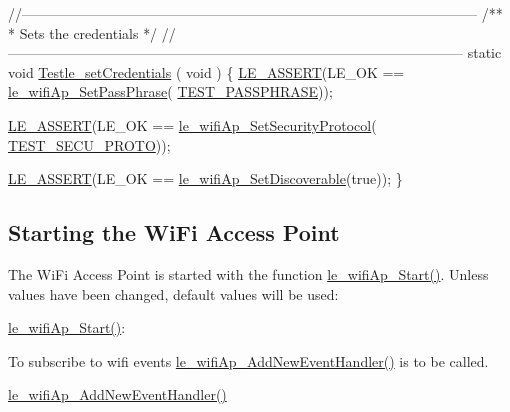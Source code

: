 \begin{DoxyCodeInclude}
\textcolor{comment}{//--------------------------------------------------------------------------------------------------}\textcolor{comment}{}
\textcolor{comment}{/**}
\textcolor{comment}{ * Sets the credentials}
\textcolor{comment}{ */}
\textcolor{comment}{//--------------------------------------------------------------------------------------------------}
\textcolor{keyword}{static} \textcolor{keywordtype}{void} \hyperlink{wifi_ap_test_8c_a9931b1b22f7842b4e5e857c037d3b80a}{Testle\_setCredentials}
(
    \textcolor{keywordtype}{void}
)
\{
    \hyperlink{le__log_8h_ac0dbbef91dc0fed449d0092ff0557b39}{LE\_ASSERT}(LE\_OK == \hyperlink{le__wifi_ap__interface_8h_a8be6c0c7aad3e14f492898df6f131c5b}{le\_wifiAp\_SetPassPhrase}(
      \hyperlink{wifi_ap_test_8c_a6dae61215af0bc9a5f4507b389439073}{TEST\_PASSPHRASE}));

    \hyperlink{le__log_8h_ac0dbbef91dc0fed449d0092ff0557b39}{LE\_ASSERT}(LE\_OK == \hyperlink{le__wifi_ap__interface_8h_a0985bb7661b81c6882a170855c7c8298}{le\_wifiAp\_SetSecurityProtocol}(
      \hyperlink{wifi_ap_test_8c_a807da4648e89f5ecce53c1700120b7b3}{TEST\_SECU\_PROTO}));

    \hyperlink{le__log_8h_ac0dbbef91dc0fed449d0092ff0557b39}{LE\_ASSERT}(LE\_OK == \hyperlink{le__wifi_ap__interface_8h_a53d220d33f1c7d7560605b5bffc13c80}{le\_wifiAp\_SetDiscoverable}(\textcolor{keyword}{true}));
\}
\end{DoxyCodeInclude}
 \hypertarget{c_le_wifi_ap_le_wifiAp_Start}{}\subsection{Starting the Wi\+Fi Access Point}\label{c_le_wifi_ap_le_wifiAp_Start}
The Wi\+Fi Access Point is started with the function \hyperlink{le__wifi_ap__interface_8h_ad21bdeabf6a8c923d246ef3c28ac42a0}{le\+\_\+wifi\+Ap\+\_\+\+Start()}. Unless values have been changed, default values will be used\+:
\begin{DoxyItemize}
\item \hyperlink{le__wifi_ap__interface_8h_ad21bdeabf6a8c923d246ef3c28ac42a0}{le\+\_\+wifi\+Ap\+\_\+\+Start()}\+:
\end{DoxyItemize}

To subscribe to wifi events \hyperlink{le__wifi_ap__interface_8h_a1ab6c2c710b61aa9b1abd30535702e38}{le\+\_\+wifi\+Ap\+\_\+\+Add\+New\+Event\+Handler()} is to be called.
\begin{DoxyItemize}
\item \hyperlink{le__wifi_ap__interface_8h_a1ab6c2c710b61aa9b1abd30535702e38}{le\+\_\+wifi\+Ap\+\_\+\+Add\+New\+Event\+Handler()}
\end{DoxyItemize}


